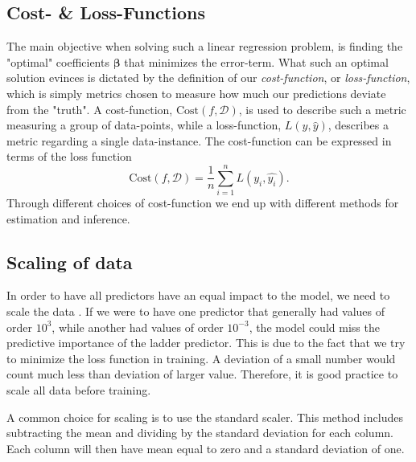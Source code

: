 
\subsection{Cost- \& Loss-Functions}
The main objective when solving such a linear regression problem, is finding the "optimal" coefficients $\boldsymbol{\beta}$ that minimizes the error-term. 
What such an optimal solution evinces is dictated by the definition of our \textit{cost-function},  or \textit{loss-function}, which is simply metrics chosen to measure how much our predictions deviate from the "truth". 
A cost-function, $\text{Cost}(f,\mathcal{D} )$, is used to describe such a metric measuring a group of data-points, while a loss-function, $L(y, \hat{y})$, describes a metric regarding a single data-instance. 
The cost-function can be expressed in terms of the loss function
\begin{equation}
\text{Cost}(f,\mathcal{D}) = \frac{1}{n}\sum_{i=1}^n L(y_i, \hat{y_i}).
\end{equation}
Through different choices of cost-function we end up with different methods for estimation and inference. 





\subsection{Scaling of data}\label{scaling}

In order to have all predictors have an equal impact to the model, we need to scale the data \citep[p. 398]{hastie}. If we were to have one predictor that generally had values of order $10^3$, while another had values of order $10^{-3}$, the model could miss the predictive importance of the ladder predictor. This is due to the fact that we try to minimize the loss function in training. A deviation of a small number would count much less than deviation of larger value. Therefore, it is good practice to scale all data before training. 

A common choice  for scaling is to use the standard scaler. This method includes subtracting the mean and dividing by the standard deviation for each column. Each column will then have mean equal to zero and a standard deviation of one. 


